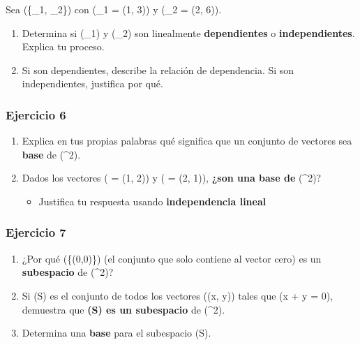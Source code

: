 \documentclass[
  letterpaper,
  DIV=11,
  numbers=noendperiod]{scrartcl}
\providecommand{\tightlist}{%
  \setlength{\itemsep}{0pt}\setlength{\parskip}{0pt}}\usepackage{longtable,booktabs,array}
\begin{document}
Sea (\{\_1, \_2\}) con (\_1 = (1, 3)) y
(\_2 = (2, 6)).

\begin{enumerate}
\def\labelenumi{\arabic{enumi}.}
\tightlist
\item
  Determina si (\_1) y (\_2) son linealmente
  \textbf{dependientes} o \textbf{independientes}. Explica tu proceso.\\
\item
  Si son dependientes, describe la relación de dependencia. Si son
  independientes, justifica por qué.
\end{enumerate}

\subsubsection{Ejercicio 6}\label{ejercicio-6}

\begin{enumerate}
\def\labelenumi{\arabic{enumi}.}
\tightlist
\item
  Explica en tus propias palabras qué significa que un conjunto de
  vectores sea \textbf{base} de (\^{}2).\\
\item
  Dados los vectores ( = (1, 2)) y ( = (2, 1)),
  \textbf{¿son una base de} (\^{}2)?

  \begin{itemize}
  \tightlist
  \item
    Justifica tu respuesta usando \textbf{independencia lineal}
  \end{itemize}
\end{enumerate}

\subsubsection{Ejercicio 7}\label{ejercicio-7}

\begin{enumerate}
\def\labelenumi{\arabic{enumi}.}
\tightlist
\item
  ¿Por qué (\{(0,0)\}) (el conjunto que solo contiene al vector cero) es
  un \textbf{subespacio} de (\^{}2)?\\
\item
  Si (S) es el conjunto de todos los vectores ((x, y)) tales que (x + y
  = 0), demuestra que \textbf{(S) es un subespacio} de
  (\^{}2).\\
\item
  Determina una \textbf{base} para el subespacio (S).
\end{enumerate}
\end{document}
